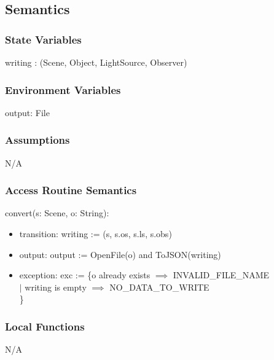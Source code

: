 \documentclass[12pt, titlepage]{article}
\begin{document}
\subsection{Semantics}
\subsubsection{State Variables}
writing : (Scene, Object, LightSource, Observer)%

\subsubsection{Environment Variables}
output: File

\subsubsection{Assumptions}
N/A

\subsubsection{Access Routine Semantics}
\noindent convert(s: Scene, o: String):
\begin{itemize}
	\item transition: writing := (s, s.os, s.ls, s.obs)
	\item output: output := OpenFile(o) and ToJSON(writing)
	\item exception: exc := \{o already exists $\implies$ INVALID\_FILE\_NAME\\
	$|$ writing is empty $\implies$ NO\_DATA\_TO\_WRITE \\
	\}
\end{itemize}

\subsubsection{Local Functions}
N/A

\newpage

\end{document}
